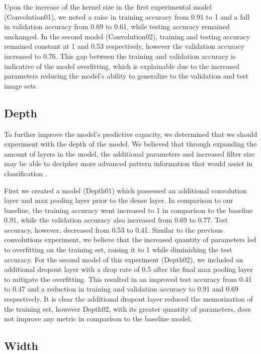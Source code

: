 \documentclass{article}
\begin{document}
Upon the increase of the kernel size in the first experimental model (Convolution01), we noted a raise in training accuracy from 0.91 to 1 and a fall in validation accuracy from 0.69 to 0.61, while testing accuracy remained unchanged. In the second model (Convolution02), training and testing accuracy remained constant at 1 and 0.53 respectively, however the validation accuracy increased to 0.76. This gap between the training and validation accuracy is indicative of the model overfitting, which is explainable due to the increased parameters reducing the model's ability to generalize to the validation and test image sets.

\subsection{Depth}

To further improve the model's predictive capacity, we determined that we should experiment with the depth of the model. We believed that through expanding the amount of layers in the model, the additional parameters and increased filter size may be able to decipher more advanced pattern information that would assist in classification \cite{Goodfellow-et-al-2016}.

First we created a model (Depth01) which possessed an additional convolution layer and max pooling layer prior to the dense layer. In comparison to our baseline, the training accuracy went increased to 1 in comparison to the baseline 0.91, while the validation accuracy also increased from 0.69 to 0.77. Test accuracy, however, decreased from 0.53 to 0.41. Similar to the previous convolutions experiment, we believe that the increased quantity of parameters led to overfitting on the training set, raising it to 1 while diminishing the test accuracy. For the second model of this experiment (Depth02), we included an additional dropout layer with a drop rate of 0.5 after the final max pooling layer to mitigate the overfitting. This resulted in an improved test accuracy from 0.41 to 0.47 and a reduction in training and validation accuracy to 0.91 and 0.69 respectively. It is clear the additional dropout layer reduced the memorization of the training set, however Depth02, with its greater quantity of parameters, does not improve any metric in comparison to the baseline model.

\subsection{Width}
\end{document}
